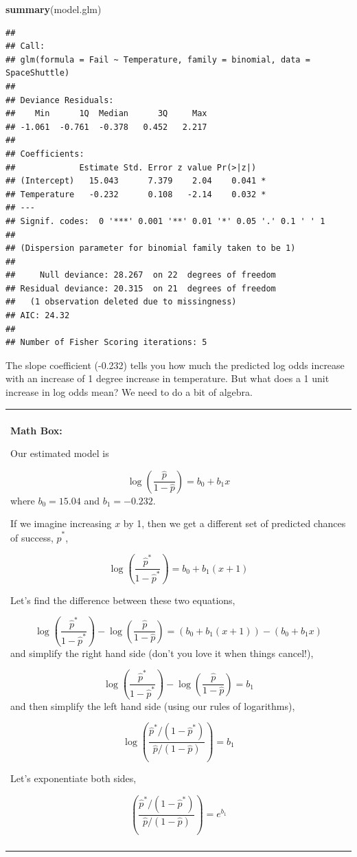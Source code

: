 \documentclass[]{book}
\newenvironment{Shaded}{\begin{snugshade}}{\end{snugshade}}
\newcommand{\KeywordTok}[1]{\textcolor[rgb]{0.13,0.29,0.53}{\textbf{#1}}}
\newcommand{\NormalTok}[1]{#1}
\newenvironment{mathbox}
{
    \begin{center}
    
    \begin{tabular}{|p{0.8\textwidth}|}
    \rowcolor{LightYellow}
    \hline\\
    \rowcolor{LightYellow}
    \textbf{Math Box:}
}
{
    \\\rowcolor{LightYellow}
    \\\hline
    \end{tabular} 
    \end{center}
}
\begin{document}
\begin{Shaded}
\begin{Highlighting}[]
\KeywordTok{summary}\NormalTok{(model.glm)}
\end{Highlighting}
\end{Shaded}

\begin{verbatim}
## 
## Call:
## glm(formula = Fail ~ Temperature, family = binomial, data = SpaceShuttle)
## 
## Deviance Residuals: 
##    Min      1Q  Median      3Q     Max  
## -1.061  -0.761  -0.378   0.452   2.217  
## 
## Coefficients:
##             Estimate Std. Error z value Pr(>|z|)  
## (Intercept)   15.043      7.379    2.04    0.041 *
## Temperature   -0.232      0.108   -2.14    0.032 *
## ---
## Signif. codes:  0 '***' 0.001 '**' 0.01 '*' 0.05 '.' 0.1 ' ' 1
## 
## (Dispersion parameter for binomial family taken to be 1)
## 
##     Null deviance: 28.267  on 22  degrees of freedom
## Residual deviance: 20.315  on 21  degrees of freedom
##   (1 observation deleted due to missingness)
## AIC: 24.32
## 
## Number of Fisher Scoring iterations: 5
\end{verbatim}

The slope coefficient (-0.232) tells you how much the predicted log odds increase with an increase of 1 degree increase in temperature. But what does a 1 unit increase in log odds mean? We need to do a bit of algebra.

\begin{mathbox}
Our estimated model is

\[\log\left(\frac{\hat{p}}{1-\hat{p}}\right) = b_0 +b_1x\] where
\(b_0 = 15.04\) and \(b_1 = -0.232\).

If we imagine increasing \(x\) by 1, then we get a different set of
predicted chances of success, \(\hat{p}^*\),

\[\log\left(\frac{\hat{p}^*}{1-\hat{p}^*}\right) = b_0 +b_1(x+1)\]

Let's find the difference between these two equations,

\[\log\left(\frac{\hat{p}^*}{1-\hat{p}^*}\right) - \log\left(\frac{\hat{p}}{1-\hat{p}}\right) = (b_0 +b_1(x+1)) - (b_0 +b_1x)\]
and simplify the right hand side (don't you love it when things
cancel!),

\[\log\left(\frac{\hat{p}^*}{1-\hat{p}^*}\right) - \log\left(\frac{\hat{p}}{1-\hat{p}}\right) = b_1\]
and then simplify the left hand side (using our rules of logarithms),

\[\log\left( \frac{\hat{p}^*/(1-\hat{p}^*)}{\hat{p}/(1-\hat{p})}\right) = b_1\]

Let's exponentiate both sides,

\[\left( \frac{\hat{p}^*/(1-\hat{p}^*)}{\hat{p}/(1-\hat{p})}\right) = e^{b_1}\]
\end{mathbox}
\end{document}
